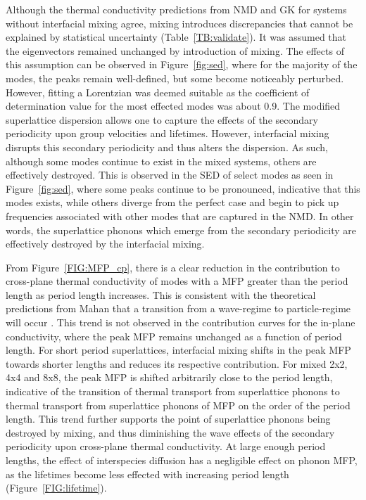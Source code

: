 \documentclass[aps,prb,preprint,preprintnumbers,amsmath,amssymb,floatfix,superscriptaddress]{revtex4}
\begin{document}
Although the thermal conductivity predictions from NMD and GK for systems without interfacial mixing agree, mixing introduces discrepancies that cannot be explained by statistical uncertainty (Table~\ref{TB:validate}). It was assumed that the eigenvectors remained unchanged by introduction of mixing. The effects of this assumption can be observed in Figure~\ref{fig:sed}, where for the majority of the modes, the peaks remain well-defined, but some become noticeably perturbed. However, fitting a Lorentzian was deemed suitable as the coefficient of determination value for the most effected modes was about 0.9. The modified superlattice dispersion allows one to capture the effects of the secondary periodicity upon group velocities and lifetimes. However, interfacial mixing disrupts this secondary periodicity and thus alters the dispersion. As such, although some modes continue to exist in the mixed systems, others are effectively destroyed. This is observed in the SED of select modes as seen in Figure~\ref{fig:sed}, where some peaks continue to be pronounced, indicative that this modes exists, while others diverge from the perfect case and begin to pick up frequencies associated with other modes that are captured in the NMD.  In other words, the superlattice phonons which emerge from the secondary periodicity are effectively destroyed by the interfacial mixing. 

From Figure~\ref{FIG:MFP_cp}, there is a clear reduction in the contribution to cross-plane thermal conductivity of modes with a MFP greater than the period length as period length increases. This is consistent with the theoretical predictions from Mahan that a transition from a wave-regime to particle-regime will occur \cite{PhysRevLett.84.927,PhysRevB.56.10754}. This trend is not observed in the contribution curves for the in-plane conductivity, where the peak MFP remains unchanged as a function of period length. For short period superlattices, interfacial mixing shifts in the peak MFP towards shorter lengths and reduces its respective contribution. For mixed 2x2, 4x4 and 8x8, the peak MFP is shifted arbitrarily close to the period length, indicative of the transition of thermal transport from superlattice phonons to thermal transport from superlattice phonons of MFP on the order of the period length. This trend further supports the point of superlattice phonons being destroyed by mixing, and thus diminishing the wave effects of the secondary periodicity upon cross-plane thermal conductivity. At large enough period lengths, the effect of interspecies diffusion has a negligible effect on phonon MFP, as the lifetimes become less effected with increasing period length (Figure~\ref{FIG:lifetime}). 
\end{document}
